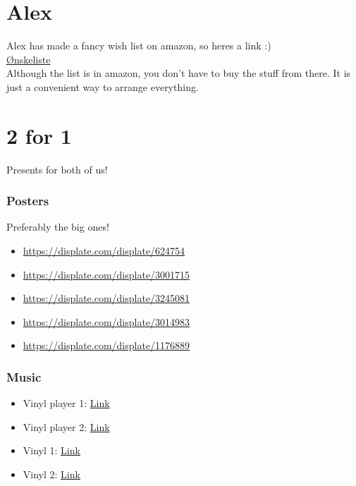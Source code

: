 \documentclass[a4paper,12pt]{article}
\begin{document}
\section*{Alex}
Alex has made a fancy wish list on amazon, so heres a link :) 
\\ \href{https://l.facebook.com/l.php?u=https%3A%2F%2Fwww.amazon.de%2Fhz%2Fwishlist%2Fls%2FI0FEDY0421U1%3Fref_%3Dwl_share%26fbclid%3DIwAR2r6Fmu--jGaw1JO6_ehBy1MhNkY85izNjS5XonXrkezc_ppPN3LRBhdhc&h=AT3MMjtl8GxziRVDvDhUiuknKw7qCgAE92xChcoe--kwQxWvH0Jv0QSKZXnP7j07JE5qKMqYSb3bgW8z_05bLmUdgqw_fpcrmFRaY3d7NLJw2EJKAZwkOAQRPsk}{Ønskeliste}
\\ Although the list is in amazon, you don't have to buy the stuff from there. It is just a convenient way to arrange everything. 

\section*{2 for 1}
Presents for both of us! 
\subsubsection*{Posters}
Preferably the big ones!
\begin{itemize}
	\item \href{https://displate.com/displate/624754}{https://displate.com/displate/624754}
	\item \href{https://displate.com/displate/3001715}{https://displate.com/displate/3001715}
	\item \href{https://displate.com/displate/3245081}{https://displate.com/displate/3245081}
	\item \href{https://displate.com/displate/3014983}{https://displate.com/displate/3014983}
	\item \href{https://displate.com/displate/1176889}{https://displate.com/displate/1176889}
\end{itemize} 
\subsubsection*{Music}
\begin{itemize}
	\item Vinyl player 1: \href{https://www.amazon.de/-/en/dp/B07NQ8KNLW/?coliid=I36YFJQOBRP2QX&colid=I0FEDY0421U1&psc=1&ref_=lv_ov_lig_dp_it&fbclid=IwAR0zv4ucUu2hG-ZGWVTsrUT5C2S32LavLMhaGOQouA512uaVTVyrXfRo-hc}{Link}
	\item Vinyl player 2: \href{https://www.amazon.de/-/en/dp/B07GGXNDMS/?coliid=I3QALSZPHZ5IUK&colid=I0FEDY0421U1&psc=1&ref_=lv_ov_lig_dp_it&fbclid=IwAR1LLihAgPRB0v8kcabZ14f8ZOh3_rE8ILWj_eXrQDFpehfXt2tFjA1HmWE}{Link}
	\item Vinyl 1:  \href{https://www.amazon.de/-/en/dp/B07FYDKR8L/?coliid=I1R1JMRWPMFOF5&colid=I0FEDY0421U1&psc=1&ref_=lv_ov_lig_dp_it&fbclid=IwAR3sJ3jOVKJTyY7iIdTVIM3MjCv22ZN2lQLADRtLLYbrH-cuwtEjLRC3J_w}{Link}
	\item Vinyl 2: \href{https://www.amazon.de/-/en/dp/B00U1Z5NAQ/?coliid=I1RUQFWOVPR7K1&colid=I0FEDY0421U1&psc=0&ref_=lv_ov_lig_dp_it&fbclid=IwAR3-6wI-xQSA2fdMws85sQ3rAOhDWITlqypf3Fx9oKjqKYkmtZm0cBHGr9s}{Link}
\end{itemize}
\end{document}
